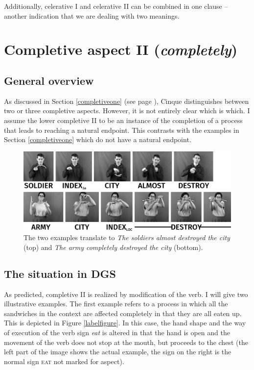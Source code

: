 \noindent Additionally, celerative I and celerative II can be combined in one clause -- another indication that we are dealing with two meanings. 


\section{Completive aspect II (\textit{completely})}\label{completivetwo}
\subsection{General overview}
As discussed in Section \ref{completiveone} (see page \pageref{completiveone}), Cinque distinguishes between two or three completive aspects. However, it is not entirely clear which is which. I assume the lower completive II to be an instance of the completion of a process that leads to reaching a natural endpoint. This contrasts with the examples in Section \ref{completiveone} which do not have a natural endpoint.


\begin{figure}[bt]
\centering
	\includegraphics[width=1.0\textwidth]{completivetwosw.jpg}
	\caption{The two examples translate to \textit{The soldiers almost destroyed the city} (top) and \textit{The army completely destroyed the city} (bottom).}
	\label{fig:completivetwodgsexampletwo}
\end{figure}


\subsection{The situation in DGS}
As predicted, completive II is realized by modification of the verb. I will give two illustrative examples. The first example refers to a process in which all the sandwiches in the context are affected completely in that they are all eaten up. This is depicted in Figure \ref{labelfigure}. In this case, the hand shape and the way of execution of the verb sign \textit{eat} is altered in that the hand is open and the movement of the verb does not stop at the mouth, but proceeds to the chest (the left part of the image shows the actual example, the sign on the right is the normal sign \textsc{eat} not marked for aspect).

